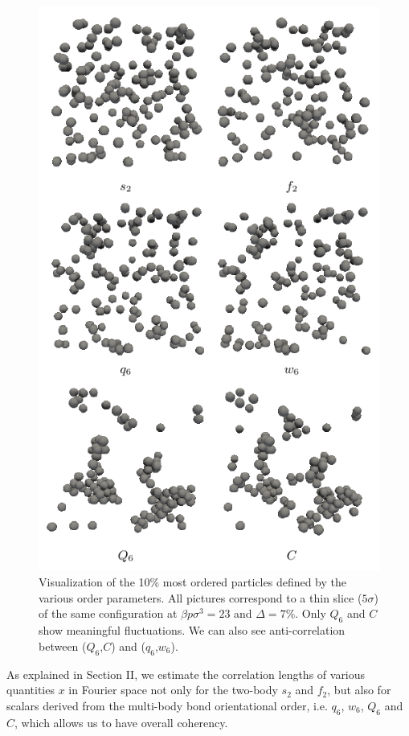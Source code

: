 \documentclass[twocolumn,superscriptaddress]{revtex4}
\begin{document}
\begin{figure}
	\centering
	\includegraphics{fig_3D}
	\caption{Visualization of the 10\% most ordered particles defined by the various order parameters. All pictures correspond to a thin slice ($5\sigma$) of the same configuration at $\beta p\sigma^3=23$ and $\Delta=7\%$. Only $Q_6$ and $C$ show meaningful fluctuations. We can also see anti-correlation between ($Q_6$,$C$) and ($q_6$,$w_6$). }
	\label{fig:3D}
\end{figure}


As explained in Section II, we estimate the correlation lengths of various quantities $x$ in Fourier space 
not only for the two-body $s_2$ and $f_2$, but also for scalars derived from the multi-body bond orientational order, i.e. $q_6$, $w_6$, $Q_6$ and $C$, 
which allows us to have overall coherency. 
\end{document}
